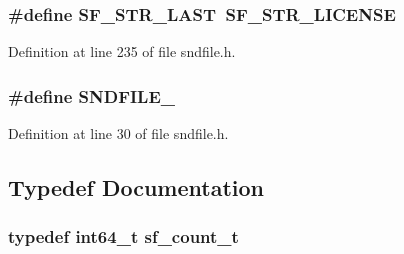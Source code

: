 \subsubsection[{\texorpdfstring{S\+F\+\_\+\+S\+T\+R\+\_\+\+L\+A\+ST}{SF_STR_LAST}}]{\setlength{\rightskip}{0pt plus 5cm}\#define S\+F\+\_\+\+S\+T\+R\+\_\+\+L\+A\+ST~{\bf S\+F\+\_\+\+S\+T\+R\+\_\+\+L\+I\+C\+E\+N\+SE}}\hypertarget{mac_2config_2i386_2lib-src_2libsndfile_2src_2sndfile_8h_a8c6c81346fe61df488dd3231d4c90110}{}\label{mac_2config_2i386_2lib-src_2libsndfile_2src_2sndfile_8h_a8c6c81346fe61df488dd3231d4c90110}


Definition at line 235 of file sndfile.\+h.

\subsubsection[{\texorpdfstring{S\+N\+D\+F\+I\+L\+E\+\_\+1}{SNDFILE_1}}]{\setlength{\rightskip}{0pt plus 5cm}\#define S\+N\+D\+F\+I\+L\+E\+\_}\hypertarget{mac_2config_2i386_2lib-src_2libsndfile_2src_2sndfile_8h_a01907163d623742301e6475255653414}{}\label{mac_2config_2i386_2lib-src_2libsndfile_2src_2sndfile_8h_a01907163d623742301e6475255653414}


Definition at line 30 of file sndfile.\+h.



\subsection{Typedef Documentation}
\subsubsection[{\texorpdfstring{sf\+\_\+count\+\_\+t}{sf_count_t}}]{\setlength{\rightskip}{0pt plus 5cm}typedef {\bf int64\+\_\+t} {\bf sf\+\_\+count\+\_\+t}}\hypertarget{mac_2config_2i386_2lib-src_2libsndfile_2src_2sndfile_8h_a398121a5f562230ea7f772528fff5f84}{}\label{mac_2config_2i386_2lib-src_2libsndfile_2src_2sndfile_8h_a398121a5f562230ea7f772528fff5f84}


